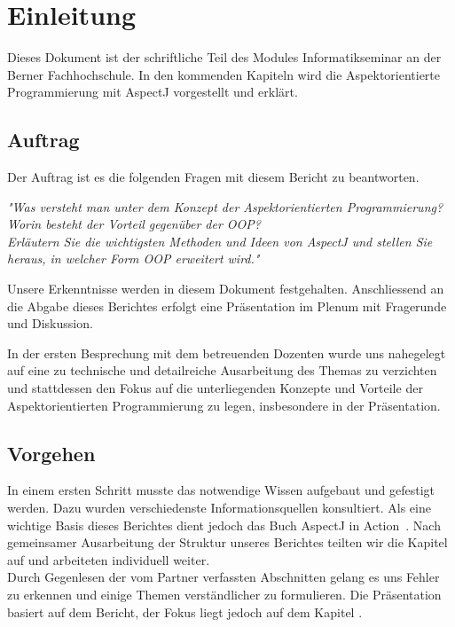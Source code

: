 \chapter{Einleitung}
\label{chap:einleitung}

Dieses Dokument ist der schriftliche Teil des Modules Informatikseminar an der Berner Fachhochschule. In den kommenden Kapiteln wird die Aspektorientierte Programmierung mit AspectJ vorgestellt und erklärt.

\nocite{laddad:aspectj}

\section{Auftrag}
\label{sec:einleitung_auftrag}

Der Auftrag ist es die folgenden Fragen mit diesem Bericht zu beantworten.

\textit{"Was versteht man unter dem Konzept der Aspektorientierten Programmierung?\\
Worin besteht der Vorteil gegenüber der OOP? \\
Erläutern Sie die wichtigsten Methoden und Ideen von AspectJ und stellen Sie heraus, in welcher Form OOP erweitert wird."} \cite{moodle:auftrag}

Unsere Erkenntnisse werden in diesem Dokument festgehalten. Anschliessend an die Abgabe dieses Berichtes erfolgt eine Präsentation im Plenum mit Fragerunde und Diskussion. 

In der ersten Besprechung mit dem betreuenden Dozenten wurde uns nahegelegt auf eine zu technische und detailreiche Ausarbeitung des Themas zu verzichten und stattdessen den Fokus auf die unterliegenden Konzepte und Vorteile der Aspektorientierten Programmierung zu legen, insbesondere in der Präsentation.

\section{Vorgehen}
\label{sec:einleitung_vorgehen}

In einem ersten Schritt musste das notwendige Wissen aufgebaut und gefestigt werden. Dazu wurden verschiedenste Informationsquellen konsultiert. Als eine wichtige Basis dieses Berichtes dient jedoch das Buch \glqq AspectJ in Action\grqq ~\cite{laddad:aspectj}. Nach gemeinsamer Ausarbeitung der Struktur unseres Berichtes teilten wir die Kapitel auf und arbeiteten individuell weiter. \\
Durch Gegenlesen der vom Partner verfassten Abschnitten gelang es uns Fehler zu erkennen und einige Themen verständlicher zu formulieren. Die Präsentation basiert auf dem Bericht, der Fokus liegt jedoch auf dem Kapitel .